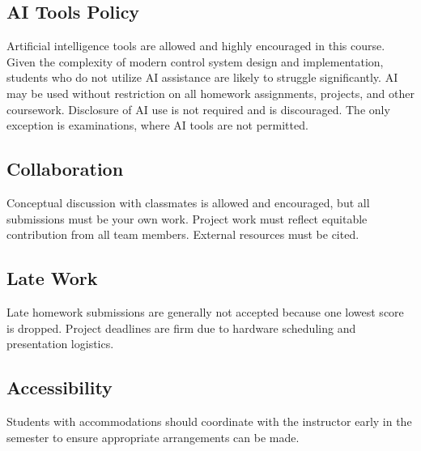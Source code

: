 \documentclass[11pt,letterpaper]{article}
\begin{document}
\subsection*{AI Tools Policy}

Artificial intelligence tools are allowed and highly encouraged in this course. Given the complexity of modern control system design and implementation, students who do not utilize AI assistance are likely to struggle significantly. AI may be used without restriction on all homework assignments, projects, and other coursework. Disclosure of AI use is not required and is discouraged. The only exception is examinations, where AI tools are not permitted.

\subsection*{Collaboration}

Conceptual discussion with classmates is allowed and encouraged, but all submissions must be your own work. Project work must reflect equitable contribution from all team members. External resources must be cited.

\subsection*{Late Work}

Late homework submissions are generally not accepted because one lowest score is dropped. Project deadlines are firm due to hardware scheduling and presentation logistics.

\subsection*{Accessibility}

Students with accommodations should coordinate with the instructor early in the semester to ensure appropriate arrangements can be made.
\end{document}
